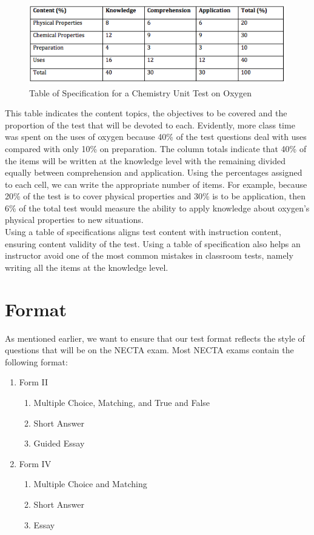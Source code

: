 \begin{figure}[h!]
\begin{center}
\includegraphics[scale=.7]{./img/picture-9.png}
\caption{Table of Specification for a Chemistry Unit Test on Oxygen}
\end{center}
\end{figure}

This table indicates the content topics, the objectives to be covered and the proportion of the test that will be devoted to each. Evidently, more class time was spent on the uses of oxygen because 40\% of the test questions deal with uses compared with only 10\% on preparation. The column totals indicate that 40\% of the items will be written at the knowledge level with the remaining divided equally between comprehension and application. Using the percentages assigned to each cell, we can write the appropriate number of items. For example, because 20\% of the test is to cover physical properties and 30\% is to be application, then 6\% of the total test would measure the ability to apply knowledge about oxygen's physical properties to new situations.\\

Using a table of specifications aligns test content with instruction content, ensuring content validity of the test.  Using a table of specification also helps an instructor avoid one of the most common mistakes in classroom tests, namely writing all the items at the knowledge level.

\section{Format}

As mentioned earlier, we want to ensure that our test format reflects the style of questions that will be on the NECTA exam.  Most NECTA exams contain the following format:

\begin{enumerate}
 \item Form II
 \begin{enumerate}
  \item Multiple Choice, Matching, and True and False
  \item Short Answer
  \item Guided Essay
 \end{enumerate}
 \item Form IV
  \begin{enumerate}
  \item Multiple Choice and Matching
  \item Short Answer
  \item Essay
 \end{enumerate}
\end{enumerate}

